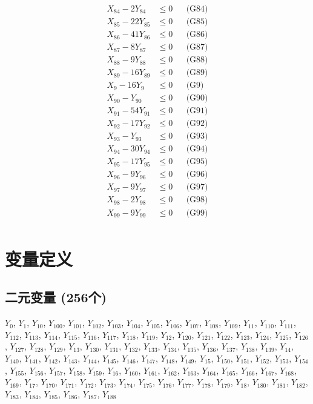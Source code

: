 \documentclass[a4paper,10pt]{article}
\begin{document}
{\begin{align}
X_{84} - 2Y_{84} &\leq 0 && \text{(G84)} \\
\allowbreak
X_{85} - 22Y_{85} &\leq 0 && \text{(G85)} \\
X_{86} - 41Y_{86} &\leq 0 && \text{(G86)} \\
X_{87} - 8Y_{87} &\leq 0 && \text{(G87)} \\
X_{88} - 9Y_{88} &\leq 0 && \text{(G88)} \\
X_{89} - 16Y_{89} &\leq 0 && \text{(G89)} \\
X_{9} - 16Y_{9} &\leq 0 && \text{(G9)} \\
X_{90} - Y_{90} &\leq 0 && \text{(G90)} \\
X_{91} - 54Y_{91} &\leq 0 && \text{(G91)} \\
X_{92} - 17Y_{92} &\leq 0 && \text{(G92)} \\
X_{93} - Y_{93} &\leq 0 && \text{(G93)} \\
X_{94} - 30Y_{94} &\leq 0 && \text{(G94)} \\
X_{95} - 17Y_{95} &\leq 0 && \text{(G95)} \\
X_{96} - 9Y_{96} &\leq 0 && \text{(G96)} \\
X_{97} - 9Y_{97} &\leq 0 && \text{(G97)} \\
X_{98} - 2Y_{98} &\leq 0 && \text{(G98)} \\
X_{99} - 9Y_{99} &\leq 0 && \text{(G99)} \\
\end{align}}

\section{变量定义}

\subsection{二元变量 (256个)}

{\small $Y_{0}$, $Y_{1}$, $Y_{10}$, $Y_{100}$, $Y_{101}$, $Y_{102}$, $Y_{103}$, $Y_{104}$, $Y_{105}$, $Y_{106}$, $Y_{107}$, $Y_{108}$, $Y_{109}$, $Y_{11}$, $Y_{110}$, $Y_{111}$, $Y_{112}$, $Y_{113}$, $Y_{114}$, $Y_{115}$, $Y_{116}$, $Y_{117}$, $Y_{118}$, $Y_{119}$, $Y_{12}$, $Y_{120}$, $Y_{121}$, $Y_{122}$, $Y_{123}$, $Y_{124}$, $Y_{125}$, $Y_{126}$, $Y_{127}$, $Y_{128}$, $Y_{129}$, $Y_{13}$, $Y_{130}$, $Y_{131}$, $Y_{132}$, $Y_{133}$, $Y_{134}$, $Y_{135}$, $Y_{136}$, $Y_{137}$, $Y_{138}$, $Y_{139}$, $Y_{14}$, $Y_{140}$, $Y_{141}$, $Y_{142}$, $Y_{143}$, $Y_{144}$, $Y_{145}$, $Y_{146}$, $Y_{147}$, $Y_{148}$, $Y_{149}$, $Y_{15}$, $Y_{150}$, $Y_{151}$, $Y_{152}$, $Y_{153}$, $Y_{154}$, $Y_{155}$, $Y_{156}$, $Y_{157}$, $Y_{158}$, $Y_{159}$, $Y_{16}$, $Y_{160}$, $Y_{161}$, $Y_{162}$, $Y_{163}$, $Y_{164}$, $Y_{165}$, $Y_{166}$, $Y_{167}$, $Y_{168}$, $Y_{169}$, $Y_{17}$, $Y_{170}$, $Y_{171}$, $Y_{172}$, $Y_{173}$, $Y_{174}$, $Y_{175}$, $Y_{176}$, $Y_{177}$, $Y_{178}$, $Y_{179}$, $Y_{18}$, $Y_{180}$, $Y_{181}$, $Y_{182}$, $Y_{183}$, $Y_{184}$, $Y_{185}$, $Y_{186}$, $Y_{187}$, $Y_{188}$}
\end{document}
